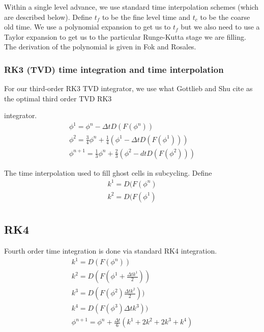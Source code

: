 \documentclass{article}
\newcommand{\dt}{{\Delta t}}
\begin{document}
Within a single level advance, we use standard time interpolation
schemes (which are described below).  Define $t_f$ to be the fine
level time and $t_c$ to be the coarse old time.  We use a polynomial
expansion to get us to $t_f$ but we also need to use a Taylor
expansion to get us to the particular Runge-Kutta stage we are
filling.   The derivation of the polynomial is given in Fok and
Rosales.   

\subsubsection{RK3 (TVD) time integration and time interpolation}

For our third-order RK3 TVD  integrator, we  use what Gottlieb and Shu
\cite{gottlieb_shu} cite as the optimal third order TVD RK3

integrator.
$$
\begin{array}{l}
\phi^1 = \phi^n - \dt D(F(\phi^n)) \\
\phi^2 = \frac{3}{4} \phi^n + \frac{1}{4} (\phi^1 - \dt D(F(\phi^1)))\\
\phi^{n+1} = \frac{1}{3} \phi^n +  \frac{2}{3}(\phi^2 - dt D(F(\phi^2)))
\end{array}
$$

The time interpolation used to fill ghost cells in subcycling.
Define
$$
\begin{array}{l}
k^1 =  D(F(\phi^n)\\
k^2 =  D(F(\phi^1)\\
\end{array}
$$

\subsection{RK4}

Fourth order time integration is done via standard RK4 integration.
$$
\begin{array}{l}
k^1 = D(F(\phi^n)) \\
k^2 = D(F(\phi^1+ \frac{\dt k^1}{2})) \\
k^3 = D(F(\phi^2) \frac{\dt k^2}{2})) \\
k^4 = D(F(\phi^3) \dt k^3)) \\
\phi^{n+1} = \phi^n + \frac{\dt}{6}(k^1 + 2 k^2 + 2 k^3 + k^4) \\
\end{array}
$$


\end{document}
